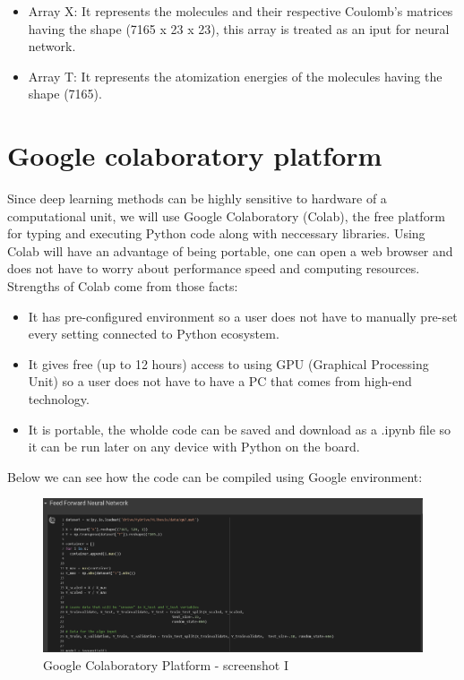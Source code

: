 \documentclass[a4paper,oneside,openright,11pt]{book}
\begin{document}
\begin{itemize}
    \item Array X: It represents the molecules and their respective Coulomb's matrices having the shape (7165 x 23 x 23), this array is treated as an iput for neural network.
    \item Array T: It represents the atomization energies of the molecules having the shape (7165).
\end{itemize}

\section{Google colaboratory platform}

Since deep learning methods can be highly sensitive to hardware of a computational unit, we will use Google Colaboratory (Colab), the free platform for typing and executing Python code along with neccessary libraries. Using Colab will have an advantage of being portable, one can open a web browser and does not have to worry about performance speed and computing resources. Strengths of Colab come from those facts:

\begin{itemize}
    \item It has pre-configured environment so a user does not have to manually pre-set every setting connected to Python ecosystem.
    \item It gives free (up to 12 hours) access to using GPU (Graphical Processing Unit) so a user does not have to have a PC that comes from high-end technology.
    \item It is portable, the wholde code can be saved and download as a .ipynb file so it can be run later on any device with Python on the board.
\end{itemize}


Below we can see how the code can be compiled using Google environment:

\begin{figure}[h!]
\centering
\includegraphics[scale=0.4]{DocumentFigures/MyFigures/feedforwardenvir.png}
\caption{Google Colaboratory Platform - screenshot I}
\end{figure}
\end{document}
